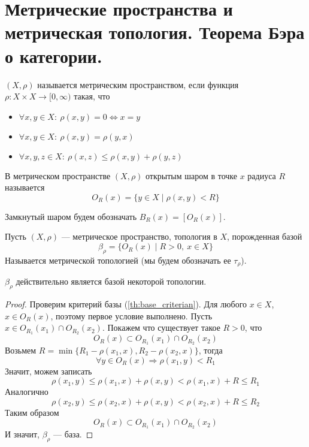 \newpage
\section{Метрические пространства и метрическая топология. Теорема Бэра о категории.}
\begin{definition}
	$(X, \rho)$ называется метрическим пространством, если функция $\rho \colon X \times X \to [0, \infty)$ такая, что 
	\begin{itemize}
		\item $\forall x,y \in X\colon \ \rho(x,y) = 0 \Leftrightarrow x = y$
		\item $\forall x,y \in X \colon \ \rho(x,y) = \rho(y,x)$
		\item $\forall x,y,z \in X \colon \ \rho(x,z) \leq \rho(x,y) + \rho(y,z)$
	\end{itemize}
\end{definition}

\begin{definition}
	В метрическом пространстве $(X,\rho)$ открытым шаром в точке $x$ радиуса $R$ называется
	$$
	O_R(x) = \{y \in X \mid \rho(x,y) < R\}
	$$
\end{definition}
\begin{definition}
	Замкнутый шаром будем обозначать $B_R(x) = [O_R(x)]$.
\end{definition}
\begin{definition}
	Пусть $(X, \rho)$ --- метрическое пространство, топология в $X$, порожденная базой 
	$$
	\beta_\rho = \{O_R(x) \mid R > 0, \ x \in X\}
	$$
	Называется метрической топологией (мы будем обозначать ее $\tau_\rho$).
\end{definition}
\begin{claim}
	$\beta_\rho$ действительно является базой некоторой топологии.
\end{claim}
\begin{proof}
	Проверим критерий базы (\ref{th:base_criterian}). Для любого $x \in X$, $x \in O_R(x)$, поэтому первое условие выполнено. Пусть $x \in O_{R_1}(x_1) \cap O_{R_2}(x_2)$. Покажем что существует такое $R > 0$, что 	
	$$
	O_R(x) \subset O_{R_1}(x_1) \cap O_{R_2}(x_2)
	$$
	Возьмем $R = \min\{R_1 - \rho(x_1, x), R_2 - \rho(x_2, x)\}$, тогда 
	$$
	\forall y \in O_R(x) \Rightarrow \rho(x_1, y) < R_1
	$$
	Значит, можем записать 
	$$
	\rho(x_1, y) \leq \rho(x_1, x) +  \rho(x, y) < \rho(x_1,x) + R \leq R_1
	$$
	Аналогично 
	$$
\rho(x_2, y) \leq \rho(x_2, x) +  \rho(x, y) < \rho(x_2,x) + R \leq  R_2
	$$
	Таким образом 
	$$
	O_R(x) \subset O_{R_1}(x_1) \cap O_{R_2}(x_2)
	$$
	И значит, $\beta_\rho$ --- база.
\end{proof}

